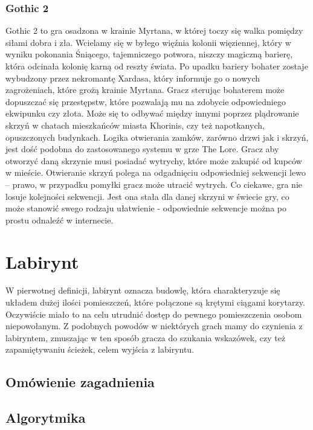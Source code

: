 \documentclass[oneside,polski,logo]{amuthesis}
\begin{document}
\subsubsection{Gothic 2}
Gothic 2 to gra osadzona w krainie Myrtana, w której toczy się walka pomiędzy siłami dobra i zła. Wcielamy się w byłego więźnia kolonii więziennej, który w wyniku pokonania Śniącego, tajemniczego potwora, niszczy magiczną barierę, która odcinała kolonię karną od reszty świata. Po upadku bariery bohater zostaje wybudzony przez nekromantę Xardasa, który informuje go o nowych zagrożeniach, które grożą krainie Myrtana. Gracz sterując bohaterem może dopuszczać się przestępstw, które pozwalają mu na zdobycie odpowiedniego ekwipunku czy złota. Może się to odbywać między innymi poprzez plądrowanie skrzyń w chatach mieszkańców miasta Khorinis, czy też napotkanych, opuszczonych budynkach. 
Logika otwierania zamków, zarówno drzwi jak i skrzyń, jest dość podobna do zastosowanego systemu w grze The Lore. Gracz aby otworzyć daną skrzynie musi posiadać wytrychy, które może zakupić od kupców w mieście. Otwieranie skrzyń polega na odgadnięciu odpowiedniej sekwencji lewo – prawo, w przypadku pomyłki gracz może utracić wytrych. Co ciekawe, gra nie losuje kolejności sekwencji. Jest ona stała dla danej skrzyni w świecie gry, co może stanowić swego rodzaju ułatwienie - odpowiednie sekwencje można po prostu odnaleźć w internecie.


\section{Labirynt}
W pierwotnej definicji, labirynt oznacza budowlę, która charakteryzuje się układem dużej ilości pomieszczeń, które połączone są krętymi ciągami korytarzy. Oczywiście miało to na celu utrudnić dostęp do pewnego pomieszczenia osobom niepowołanym. Z podobnych powodów w niektórych grach mamy do czynienia z labiryntem, zmuszając w ten sposób gracza do szukania wskazówek, czy też zapamiętywaniu ścieżek, celem wyjścia z labiryntu. 
\subsection{Omówienie zagadnienia}
\subsection{Algorytmika}
\end{document}
